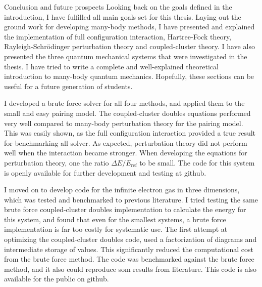 \documentclass[twoside,english]{uiofysmaster}
\begin{document}
\begin{chapter}{Conclusion and future prospects}
	Looking back on the goals defined in the introduction, I have fulfilled all main goals set for this thesis. Laying out the ground work for developing many-body methods, I have presented and explained the implementation of full configuration interaction, Hartree-Fock theory, Rayleigh-Schr\"{o}dinger perturbation theory and coupled-cluster theory. I have also presented the three quantum mechanical systems that were investigated in the thesis. I have tried to write a complete and well-explained theoretical introduction to many-body quantum mechanics. Hopefully, these sections can be useful for a future generation of students. 

  I developed a brute force solver for all four methods, and applied them to the small and easy pairing model. The coupled-cluster doubles equations performed very well compared to many-body perturbation theory for the pairing model. This was easily shown, as the full configuration interaction provided a true result for benchmarking all solver. As expected, perturbation theory did not perform well when the interaction became stronger. When developing the equations for perturbation theory, one  the ratio $\Delta E/E_{\text{ref}}$ to be small. The code for this system is openly available for further development and testing at github.  

  I moved on to develop code for the infinite electron gas in three dimensions, which was tested and benchmarked to previous literature. I tried testing the same brute force coupled-cluster doubles implementation to calculate the energy for this system, and found that even for the smallest systems, a brute force implementation is far too costly for systematic use. The first attempt at optimizing the coupled-cluster doubles code, used a factorization of diagrams and intermediate storage of values. This significantly reduced the computational cost from the brute force method. The code was benchmarked against the brute force method, and it also could reproduce som results from literature. This code is also available for the public on github. 


\end{chapter}
\end{document}
